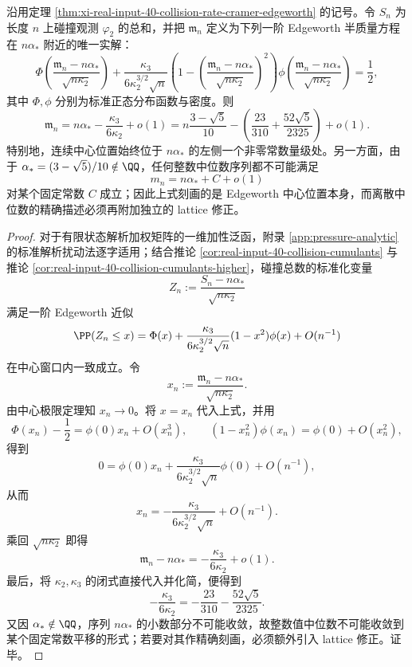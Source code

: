 \begin{corollary}\label{cor:xi-real-input-40-collision-edgeworth-continuous-median-shift}
沿用定理 \ref{thm:xi-real-input-40-collision-rate-cramer-edgeworth} 的记号。令 \(S_n\) 为长度 \(n\) 上碰撞观测 \(\varphi_2\) 的总和，并把 \(\mathfrak m_n\) 定义为下列一阶 Edgeworth 半质量方程在 \(n\alpha_*\) 附近的唯一实解：
\[
\Phi\!\left(\frac{\mathfrak m_n-n\alpha_*}{\sqrt{n\kappa_2}}\right)
+\frac{\kappa_3}{6\kappa_2^{3/2}\sqrt n}
\left(
1-\left(\frac{\mathfrak m_n-n\alpha_*}{\sqrt{n\kappa_2}}\right)^2
\right)
\phi\!\left(\frac{\mathfrak m_n-n\alpha_*}{\sqrt{n\kappa_2}}\right)
=
\frac12,
\]
其中 \(\Phi,\phi\) 分别为标准正态分布函数与密度。则
\[
\boxed{\;
\mathfrak m_n
=
n\alpha_*-\frac{\kappa_3}{6\kappa_2}+o(1)
=
n\frac{3-\sqrt5}{10}
-\left(\frac{23}{310}+\frac{52\sqrt5}{2325}\right)+o(1).\;}
\]
特别地，连续中心位置始终位于 \(n\alpha_*\) 的左侧一个非零常数量级处。另一方面，由于 \(\alpha_*=(3-\sqrt5)/10\notin\QQ\)，任何整数中位数序列都不可能满足
\[
m_n=n\alpha_*+C+o(1)
\]
对某个固定常数 \(C\) 成立；因此上式刻画的是 Edgeworth 中心位置本身，而离散中位数的精确描述必须再附加独立的 lattice 修正。
\end{corollary}
\begin{proof}
对于有限状态解析加权矩阵的一维加性泛函，附录 \ref{app:pressure-analytic} 的标准解析扰动法逐字适用；结合推论 \ref{cor:real-input-40-collision-cumulants} 与推论 \ref{cor:real-input-40-collision-cumulants-higher}，碰撞总数的标准化变量
\[
Z_n:=\frac{S_n-n\alpha_*}{\sqrt{n\kappa_2}}
\]
满足一阶 Edgeworth 近似
\[
\PP(Z_n\le x)
=
\Phi(x)
+\frac{\kappa_3}{6\kappa_2^{3/2}\sqrt n}(1-x^2)\phi(x)
+O(n^{-1})
\]
在中心窗口内一致成立。令
\[
x_n:=\frac{\mathfrak m_n-n\alpha_*}{\sqrt{n\kappa_2}}.
\]
由中心极限定理知 \(x_n\to0\)。将 \(x=x_n\) 代入上式，并用
\[
\Phi(x_n)-\frac12=\phi(0)x_n+O(x_n^3),
\qquad
(1-x_n^2)\phi(x_n)=\phi(0)+O(x_n^2),
\]
得到
\[
0=\phi(0)x_n+\frac{\kappa_3}{6\kappa_2^{3/2}\sqrt n}\phi(0)+O(n^{-1}),
\]
从而
\[
x_n=-\frac{\kappa_3}{6\kappa_2^{3/2}\sqrt n}+O(n^{-1}).
\]
乘回 \(\sqrt{n\kappa_2}\) 即得
\[
\mathfrak m_n-n\alpha_*=-\frac{\kappa_3}{6\kappa_2}+o(1).
\]
最后，将 \(\kappa_2,\kappa_3\) 的闭式直接代入并化简，便得到
\[
-\frac{\kappa_3}{6\kappa_2}
=
-\frac{23}{310}-\frac{52\sqrt5}{2325}.
\]
又因 \(\alpha_*\notin\QQ\)，序列 \(n\alpha_*\) 的小数部分不可能收敛，故整数值中位数不可能收敛到某个固定常数平移的形式；若要对其作精确刻画，必须额外引入 lattice 修正。证毕。
\end{proof}

